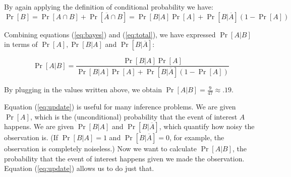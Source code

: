 \documentclass[11pt]{article}
\begin{document}

\begin{center}
\end{center}
 
By again applying the definition of conditional probability we have:
 \begin{equation}
\label{eq:total}
 \Pr [B] = \Pr [A \cap B] + \Pr [\overline{A} \cap B] = \Pr [B|A]\Pr [A] +
\Pr [B|\overline{A}] (1-\Pr [A])
 \end{equation}
 
Combining equations (\ref{eq:bayes}) and (\ref{eq:total}),  we have
expressed $\Pr [A|B]$ in terms of $\Pr [A], \Pr [B|A] $ and $\Pr
[B|\overline{A}]$:

\begin{equation}
\label{eq:update}
 \Pr [A|B] = \frac{\Pr [B|A] \Pr [A]}{\Pr [B|A]\Pr [A] +
\Pr [B|\overline{A}] (1-\Pr [A])}
 \end{equation}
 
 By plugging in the values written above, we obtain $\Pr[A|B] = \frac{9}{47}\approx .19$. 

Equation (\ref{eq:update}) is useful for many inference problems. We are given
$\Pr [A]$, which is the (unconditional) probability that the event
of interest $A$ happens. We are given $\Pr [B|A]$ and $\Pr
[B|\overline{A}]$, which quantify how noisy the observation is. (If
$\Pr [B|A] =1$ and $\Pr [B|\overline{A}] = 0$, for example, the
observation is completely noiseless.) Now we want to calculate $\Pr
[A|B]$, the probability that the event of interest happens given we
made the observation. Equation (\ref{eq:update}) allows us to do
just that.\\\\
\end{document}
